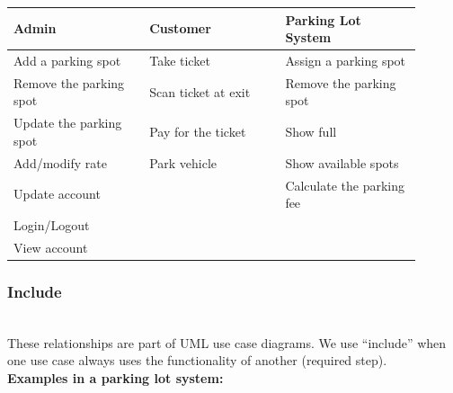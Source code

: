 \begin{table}[h!]
\centering
\begin{tabular}{|p{0.30\linewidth}|p{0.30\linewidth}|p{0.30\linewidth}|}
\hline
\textbf{Admin} & \textbf{Customer} & \textbf{Parking Lot System} \\
\hline

Add a parking spot & Take ticket & Assign a parking spot \\
\hline

Remove the parking spot & Scan ticket at exit & Remove the parking spot \\
\hline

Update the parking spot & Pay for the ticket & Show full \\
\hline

Add/modify rate & Park vehicle & Show available spots \\
\hline

Update account &  & Calculate the parking fee \\
\hline

Login/Logout &  &  \\
\hline

View account &  &  \\
\hline

\end{tabular}
\end{table}


\subsubsection{Include}\label{QhpKzwQ2mB8LjKShCDIle}
\\
These relationships are part of UML use case diagrams. We use ``include'' when one use case always uses the functionality of another (required step).
\\
\textbf{Examples in a parking lot system:}

